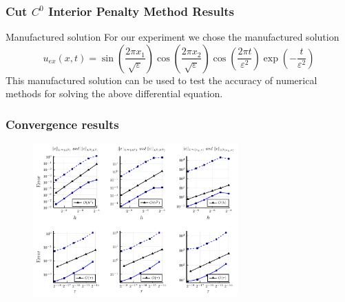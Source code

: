 \begin{frame}
\frametitle{ Cut $C^0$ Interior Penalty Method Results }

\begin{block}{Manufactured solution}
For our experiment we chose the manufactured solution
\begin{equation}
    u_{ ex }(x, t) = \sin\left(\frac{2\pi x_1}{\sqrt{\varepsilon}}\right)\cos\left(\frac{2 \pi x_2}{\sqrt{\varepsilon}}\right)\cos\left(\frac{2\pi t}{\varepsilon^2}\right)\exp\left(-\frac{t}{\varepsilon^2}\right)
\end{equation}
This manufactured solution can be used to test the accuracy of numerical methods for solving the above differential equation.
\end{block}
\end{frame}


\begin{frame}
\frametitle{Convergence results}
\begin{figure}[h]
    \centering
    \includegraphics[width=0.7\textwidth]{CH-example/spatial-plot.pdf}
\end{figure}
\end{frame}


